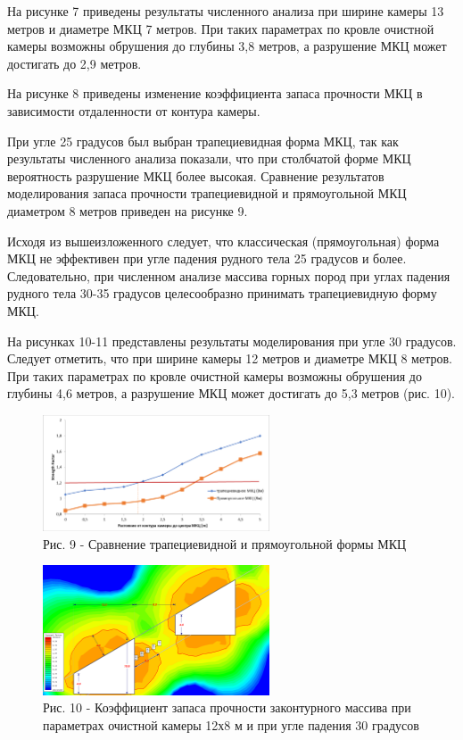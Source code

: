 \begin{multicols}{2}
На рисунке 7 приведены результаты численного анализа при ширине камеры
13 метров и диаметре МКЦ 7 метров. При таких параметрах по кровле
очистной камеры возможны обрушения до глубины 3,8 метров, а разрушение
МКЦ может достигать до 2,9 метров.

На рисунке 8 приведены изменение коэффициента запаса прочности МКЦ в
зависимости отдаленности от контура камеры.

При угле 25 градусов был выбран трапециевидная форма МКЦ, так как
результаты численного анализа показали, что при столбчатой форме МКЦ
вероятность разрушение МКЦ более высокая. Сравнение результатов
моделирования запаса прочности трапециевидной и прямоугольной МКЦ
диаметром 8 метров приведен на рисунке 9.

Исходя из вышеизложенного следует, что классическая (прямоугольная)
форма МКЦ не эффективен при угле падения рудного тела 25 градусов и
более. Следовательно, при численном анализе массива горных пород при
углах падения рудного тела 30-35 градусов целесообразно принимать
трапециевидную форму МКЦ.

На рисунках 10-11 представлены результаты моделирования при угле 30
градусов. Следует отметить, что при ширине камеры 12 метров и диаметре
МКЦ 8 метров. При таких параметрах по кровле очистной камеры возможны
обрушения до глубины 4,6 метров, а разрушение МКЦ может достигать до 5,3
метров (рис. 10).
\end{multicols}

\begin{figure}[H]
	\centering
	\includegraphics[width=0.6\textwidth]{assets/289}
	\caption*{Рис. 9 - Сравнение трапециевидной и прямоугольной формы МКЦ}
\end{figure}

\begin{figure}[H]
	\centering
	\includegraphics[width=0.6\textwidth]{assets/290}
	\caption*{Рис. 10 - Коэффициент запаса прочности законтурного массива при
параметрах очистной камеры 12х8 м и при угле падения 30 градусов}
\end{figure}

